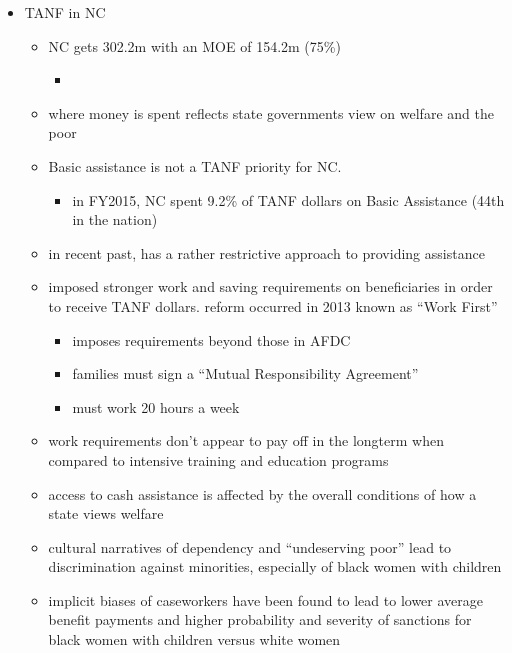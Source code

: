 \documentclass[12pt,letterpaperpaper,]{book}
\providecommand{\tightlist}{%
  \setlength{\itemsep}{0pt}\setlength{\parskip}{0pt}}
\begin{document}
\begin{itemize}
\tightlist
\item
  TANF in NC

  \begin{itemize}
  \tightlist
  \item
    NC gets 302.2m with an MOE of 154.2m (75\%)

    \begin{itemize}
    \tightlist
    \item
      \citep{falk_temporary_2016}
    \end{itemize}
  \item
    where money is spent reflects state governments view on welfare and
    the poor
  \item
    Basic assistance is not a TANF priority for NC.

    \begin{itemize}
    \tightlist
    \item
      in FY2015, NC spent 9.2\% of TANF dollars on Basic Assistance
      (44th in the nation)
      \citep[\citet{schott_how_2015}]{us_dhhs_tanf_2015}\\
    \end{itemize}
  \item
    in recent past, has a rather restrictive approach to providing
    assistance
  \item
    imposed stronger work and saving requirements on beneficiaries in
    order to receive TANF dollars. reform occurred in 2013 known as
    ``Work First''

    \begin{itemize}
    \tightlist
    \item
      imposes requirements beyond those in AFDC
    \item
      families must sign a ``Mutual Responsibility Agreement''
    \item
      must work 20 hours a week
    \end{itemize}
  \item
    work requirements don't appear to pay off in the longterm when
    compared to intensive training and education programs
    \citep{pavetti_work_2016}
  \item
    access to cash assistance is affected by the overall conditions of
    how a state views welfare
  \item
    cultural narratives of dependency and ``undeserving poor'' lead to
    discrimination against minorities, especially of black women with
    children \citep{mannix_tanf_2013}
  \item
    implicit biases of caseworkers have been found to lead to lower
    average benefit payments and higher probability and severity of
    sanctions for black women with children versus white women
    \citep{soss_disciplining_2011}
  \end{itemize}
\end{itemize}
\end{document}
